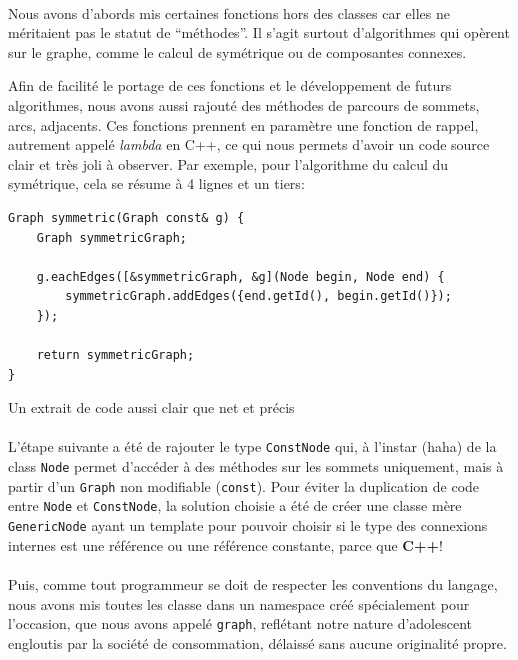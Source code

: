 \documentclass[french]{article}
\begin{document}
\paragraph{} Nous avons d'abords mis certaines fonctions hors des classes car
elles ne méritaient pas le statut de ``méthodes''. Il s'agit surtout
d'algorithmes qui opèrent sur le graphe, comme le calcul de symétrique ou de
composantes connexes.

Afin de facilité le portage de ces fonctions et le développement de futurs
algorithmes, nous avons aussi rajouté des méthodes de parcours de sommets,
arcs, adjacents. Ces fonctions prennent en paramètre une fonction de rappel,
autrement appelé \emph{lambda} en C++, ce qui nous permets d'avoir un code
source clair et très joli à observer. Par exemple, pour l'algorithme du calcul
du symétrique, cela se résume à 4 lignes et un tiers:

\begin{listing}[H]
\begin{verbatim}
Graph symmetric(Graph const& g) {
	Graph symmetricGraph;

	g.eachEdges([&symmetricGraph, &g](Node begin, Node end) {
		symmetricGraph.addEdges({end.getId(), begin.getId()});
	});

	return symmetricGraph;
}
\end{verbatim}
\caption{Un extrait de code aussi clair que net et précis}
\label{tsp:symmetric}
\end{listing}

\paragraph{} L'étape suivante a été de rajouter le type \texttt{ConstNode} qui,
à l'instar (haha) de la class \texttt{Node} permet d'accéder à des méthodes sur
les sommets uniquement, mais à partir d'un \texttt{Graph} non modifiable
(\texttt{const}). Pour éviter la duplication de code entre
\texttt{Node} et \texttt{ConstNode}, la solution choisie a été de créer une
classe mère \texttt{GenericNode} ayant un template pour pouvoir choisir si le
type des connexions internes est une référence ou une référence constante,
parce que \textbf{C++}!

\paragraph{} Puis, comme tout programmeur se doit de respecter les conventions
du langage, nous avons mis toutes les classe dans un namespace créé
spécialement pour l'occasion, que nous avons appelé \texttt{graph}, reflétant
notre nature d'adolescent engloutis par la société de consommation, délaissé
sans aucune originalité propre.
\end{document}
